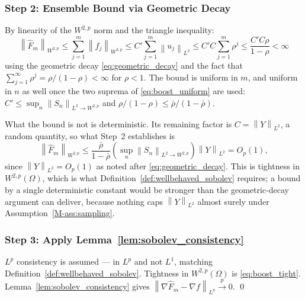 \documentclass[12pt,a4paper]{article}
\numberwithin{equation}{section}
\theoremstyle{plain}
\theoremstyle{definition}
\newcommand{\norm}[1]{\left\| #1 \right\|}
\newcommand{\Wtwop}{W^{2,p}(\Omega)}
\newcommand{\xrightarrowp}{\xrightarrow{p}}
\begin{document}
	\subsubsection*{Step 2: Ensemble Bound via Geometric Decay}
	
	By linearity of the $W^{2,p}$ norm and the triangle inequality:
	\begin{equation}
		\norm{\hat{F}_m}_{W^{2,p}}
		\leq \sum_{j=1}^m \norm{\hat{f}_j}_{W^{2,p}}
		\leq C' \sum_{j=1}^m \norm{u_j}_{L^2}
		\leq C'C \sum_{j=1}^m \rho^j
		\leq \frac{C'C\rho}{1-\rho}
		< \infty
	\end{equation}
	using the geometric decay \eqref{eq:geometric_decay} and the fact that
	$\sum_{j=1}^\infty \rho^j = \rho/(1-\rho) < \infty$ for $\rho < 1$. The bound
	is uniform in $m$, and uniform in $n$ as well once the two suprema of
	\eqref{eq:boost_uniform} are used: $C' \leq \sup_n \norm{S_n}_{L^2 \to W^{2,p}}$
	and $\rho/(1-\rho) \leq \bar{\rho}/(1-\bar{\rho})$.

	What the bound is not is deterministic. Its remaining factor is
	$C = \norm{Y}_{L^2}$, a random quantity, so what Step~2 establishes is
	\begin{equation}
		\norm{\hat{F}_m}_{W^{2,p}}
		\leq \frac{\bar{\rho}}{1-\bar{\rho}}
		\left(\sup_n \norm{S_n}_{L^2 \to W^{2,p}}\right) \norm{Y}_{L^2}
		= O_p(1),
		\label{eq:boost_tight}
	\end{equation}
	since $\norm{Y}_{L^2} = O_p(1)$ as noted after \eqref{eq:geometric_decay}.
	This is tightness in $\Wtwop$, which is what
	Definition~\ref{def:wellbehaved_sobolev} requires; a bound by a single
	deterministic constant would be stronger than the geometric-decay argument
	can deliver, because nothing caps $\norm{Y}_{L^2}$ almost surely under
	Assumption~\ref{M-ass:sampling}.

	\subsubsection*{Step 3: Apply Lemma~\ref{lem:sobolev_consistency}}

	$L^p$ consistency is assumed --- in $L^p$ and not $L^1$, matching
	Definition~\ref{def:wellbehaved_sobolev}. Tightness in $\Wtwop$ is
	\eqref{eq:boost_tight}. Lemma~\ref{lem:sobolev_consistency} gives
	$\norm{\nabla \hat{F}_m - \nabla f}_{L^p} \xrightarrowp 0$. \qed
	
\end{document}
